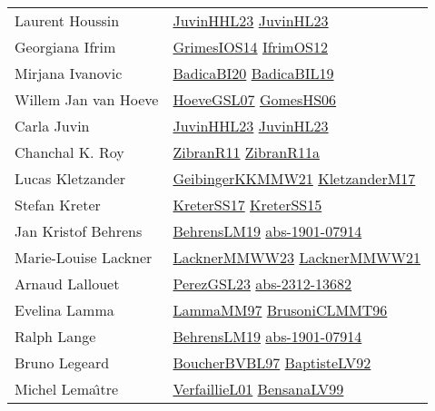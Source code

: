 {\begin{longtable}{p{4cm}p{20cm}}
Laurent Houssin & \href{papers/JuvinHHL23.pdf}{JuvinHHL23}\cite{JuvinHHL23} \href{papers/JuvinHL23.pdf}{JuvinHL23}\cite{JuvinHL23} \\
Georgiana Ifrim & \href{articles/GrimesIOS14.pdf}{GrimesIOS14}\cite{GrimesIOS14} \href{papers/IfrimOS12.pdf}{IfrimOS12}\cite{IfrimOS12} \\
Mirjana Ivanovic & \href{}{BadicaBI20}\cite{BadicaBI20} \href{papers/BadicaBIL19.pdf}{BadicaBIL19}\cite{BadicaBIL19} \\
Willem Jan van Hoeve & \href{papers/HoeveGSL07.pdf}{HoeveGSL07}\cite{HoeveGSL07} \href{papers/GomesHS06.pdf}{GomesHS06}\cite{GomesHS06} \\
Carla Juvin & \href{papers/JuvinHHL23.pdf}{JuvinHHL23}\cite{JuvinHHL23} \href{papers/JuvinHL23.pdf}{JuvinHL23}\cite{JuvinHL23} \\
Chanchal K. Roy & \href{papers/ZibranR11.pdf}{ZibranR11}\cite{ZibranR11} \href{papers/ZibranR11a.pdf}{ZibranR11a}\cite{ZibranR11a} \\
Lucas Kletzander & \href{papers/GeibingerKKMMW21.pdf}{GeibingerKKMMW21}\cite{GeibingerKKMMW21} \href{papers/KletzanderM17.pdf}{KletzanderM17}\cite{KletzanderM17} \\
Stefan Kreter & \href{articles/KreterSS17.pdf}{KreterSS17}\cite{KreterSS17} \href{papers/KreterSS15.pdf}{KreterSS15}\cite{KreterSS15} \\
Jan Kristof Behrens & \href{papers/BehrensLM19.pdf}{BehrensLM19}\cite{BehrensLM19} \href{articles/abs-1901-07914.pdf}{abs-1901-07914}\cite{abs-1901-07914} \\
Marie{-}Louise Lackner & \href{articles/LacknerMMWW23.pdf}{LacknerMMWW23}\cite{LacknerMMWW23} \href{papers/LacknerMMWW21.pdf}{LacknerMMWW21}\cite{LacknerMMWW21} \\
Arnaud Lallouet & \href{papers/PerezGSL23.pdf}{PerezGSL23}\cite{PerezGSL23} \href{articles/abs-2312-13682.pdf}{abs-2312-13682}\cite{abs-2312-13682} \\
Evelina Lamma & \href{articles/LammaMM97.pdf}{LammaMM97}\cite{LammaMM97} \href{papers/BrusoniCLMMT96.pdf}{BrusoniCLMMT96}\cite{BrusoniCLMMT96} \\
Ralph Lange & \href{papers/BehrensLM19.pdf}{BehrensLM19}\cite{BehrensLM19} \href{articles/abs-1901-07914.pdf}{abs-1901-07914}\cite{abs-1901-07914} \\
Bruno Legeard & \href{}{BoucherBVBL97}\cite{BoucherBVBL97} \href{papers/BaptisteLV92.pdf}{BaptisteLV92}\cite{BaptisteLV92} \\
Michel Lema{\^{\i}}tre & \href{papers/VerfaillieL01.pdf}{VerfaillieL01}\cite{VerfaillieL01} \href{articles/BensanaLV99.pdf}{BensanaLV99}\cite{BensanaLV99} \\

\end{longtable}}
